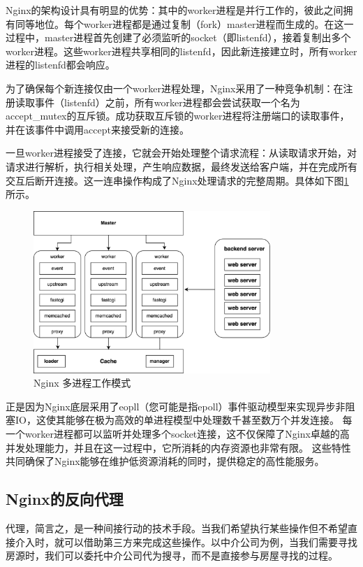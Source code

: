 Nginx的架构设计具有明显的优势：其中的worker进程是并行工作的，彼此之间拥有同等地位。每个worker进程都是通过复制（fork）master进程而生成的。在这一过程中，master进程首先创建了必须监听的socket（即listenfd），接着复制出多个worker进程。这些worker进程共享相同的listenfd，因此新连接建立时，所有worker进程的listenfd都会响应。

为了确保每个新连接仅由一个worker进程处理，Nginx采用了一种竞争机制：在注册读取事件（listenfd）之前，所有worker进程都会尝试获取一个名为accept\_mutex的互斥锁。成功获取互斥锁的worker进程将注册端口的读取事件，并在该事件中调用accept来接受新的连接。

一旦worker进程接受了连接，它就会开始处理整个请求流程：从读取请求开始，对请求进行解析，执行相关处理，产生响应数据，最终发送给客户端，并在完成所有交互后断开连接。这一连串操作构成了Nginx处理请求的完整周期。具体如下图\ref{nginx_multi_process}所示。

\begin{figure}[htbp]
	\centering
	\includegraphics[width=0.8\textwidth]{figures/master-worker.png}
	\caption{Nginx 多进程工作模式}
	\label{nginx_multi_process}
\end{figure}

正是因为Nginx底层采用了eopll（您可能是指epoll）事件驱动模型来实现异步非阻塞IO，这使其能够在极为高效的单进程模型中处理数千甚至数万个并发连接。
每一个worker进程都可以监听并处理多个socket连接，这不仅保障了Nginx卓越的高并发处理能力，并且在这一过程中，它所消耗的内存资源也非常有限\cite{张炜森2018nginx}。
这些特性共同确保了Nginx能够在维护低资源消耗的同时，提供稳定的高性能服务。

\subsection{Nginx的反向代理}

代理，简言之，是一种间接行动的技术手段。当我们希望执行某些操作但不希望直接介入时，就可以借助第三方来完成这些操作。以中介公司为例，当我们需要寻找房源时，我们可以委托中介公司代为搜寻，而不是直接参与房屋寻找的过程。

